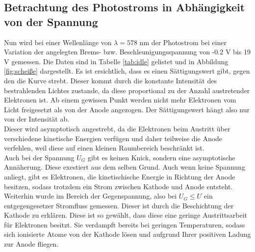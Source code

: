 \subsection{Betrachtung des Photostroms in Abhängigkeit von der Spannung}
  Nun wird bei einer Wellenlänge von $\lambda = 578$ nm der Photostrom bei einer Variation
  der angelegten Brems- bzw. Beschleunigungsspannung von -0.2 V bis 19 V gemessen. Die
  Daten sind in Tabelle \ref{tab:idle} gelistet und in Abbildung \ref{fig:scheiße} dargestellt.
  Es ist ersichtlich, dass es einen Sättigungswert gibt, gegen den die Kurve strebt.
  Dieser kommt durch die konstante Intensität des bestrahlenden Lichtes 
  zustande, da diese proportional zu der Anzahl austretender Elektronen ist.
  Ab einem gewissen Punkt werden nicht mehr Elektronen vom Licht freigesetzt
  als von der Anode angezogen. Der Sättigungswert hängt also nur von der Intensität ab.\\
  Dieser wird asymptotisch angestrebt, da die Elektronen beim Austritt über
  verschiedene kinetische Energien verfügen und daher teilweise die Anode verfehlen,
  weil diese auf einen kleinen Raumbereich beschränkt ist.\\
  Auch bei der Spannung $U_G$ gibt es keinen Knick, sondern eine asymptotische Annäherung.
  Diese exestiert aus dem selben Grund. Auch wenn keine Spannung anliegt, gibt es Elektronen,
  die kinetischische Energie in Richtung der Anode besitzen, sodass trotzdem ein Strom zwischen 
  Kathode und Anode entsteht. \\
  Weiterhin wurde im Bereich der Gegenspannung, also bei $U_G \leq U$ ein entgegengesetzer 
  Stromfluss gemessen. Dieser ist durch die Beschichtung der Kathode zu erklären. Diese
  ist so gewählt, dass diese eine geringe Austrittsarbeit für Elektronen besitzt. Sie 
  verdampft bereits bei geringen Temperaturen, sodass sich ionisierte Atome von der Kathode 
  lösen und aufgrund Ihrer positiven Ladung zur Anode fliegen.\\

